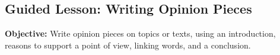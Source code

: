 \documentclass[12pt]{article}
\title{}
\date{}
\begin{document}
\subsection*{Guided Lesson: Writing Opinion Pieces}
\onehalfspacing

\begin{tcolorbox}[colframe=black!40, colback=gray!5, 
coltitle=black, colbacktitle=black!20, fonttitle=\bfseries\Large, 
title=Learning Objective, halign title=center, left=5pt, right=5pt, top=5pt, bottom=15pt]
\textbf{Objective:} Write opinion pieces on topics or texts, using an introduction, reasons to support a point of view, linking words, and a conclusion.  
\end{tcolorbox}

\vspace{1em}
\end{document}
